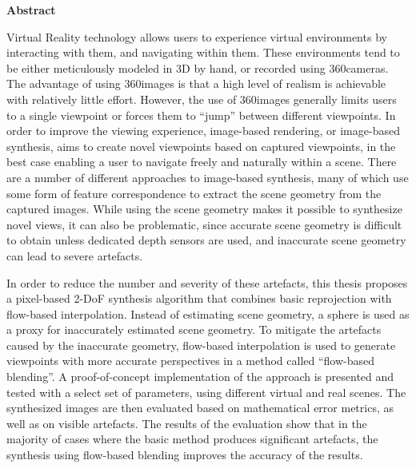 \vspace*{2cm}

\begin{center}
    \textbf{Abstract}
\end{center}

\vspace*{1cm}

\noindent 
Virtual Reality technology allows users to experience virtual environments by interacting with them, and navigating within them. These environments tend to be either meticulously modeled in 3D by hand, or recorded using 360\degree cameras. The advantage of using 360\degree images is that a high level of realism is achievable with relatively little effort. However, the use of 360\degree images generally limits users to a single viewpoint or forces them to ``jump'' between different viewpoints.
In order to improve the viewing experience, image-based rendering, or image-based synthesis, aims to create novel viewpoints based on captured viewpoints, in the best case enabling a user to navigate freely and naturally within a scene.
There are a number of different approaches to image-based synthesis, many of which use some form of feature correspondence to extract the scene geometry from the captured images.
While using the scene geometry makes it possible to synthesize novel views, it can also be problematic, since accurate scene geometry is difficult to obtain unless dedicated depth sensors are used, and inaccurate scene geometry can lead to severe artefacts.

In order to reduce the number and severity of these artefacts,
this thesis proposes a pixel-based 2-DoF synthesis algorithm that combines basic reprojection with flow-based interpolation.
Instead of estimating scene geometry, a sphere is used as a proxy for inaccurately estimated scene geometry.
To mitigate the artefacts caused by the inaccurate geometry, flow-based interpolation is used to generate viewpoints with more accurate perspectives in a method called ``flow-based blending''.
A proof-of-concept implementation of the approach is presented and tested with a select set of parameters, using different virtual and real scenes.
The synthesized images are then evaluated based on mathematical error metrics, as well as on visible artefacts. The results of the evaluation show that in the majority of cases where the basic method produces significant artefacts, the synthesis using flow-based blending improves the accuracy of the results.
